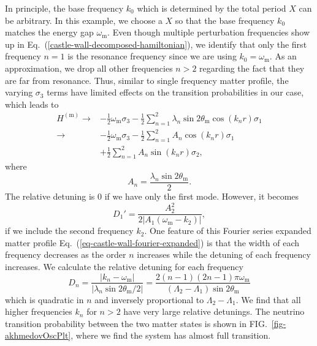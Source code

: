 \documentclass[%
reprint,
 amsmath,amssymb,
 prd,
]{revtex4-1}
\newcommand{\RD}{D}
\begin{document}
In principle, the base frequency $k_0$ which is determined by the total period $X$ can be arbitrary. In this example, we choose a $X$ so that the base frequency $k_0$ matches the energy gap $\omega_{\mathrm{m}}$. Even though multiple perturbation frequencies show up in Eq.~(\ref{castle-wall-decomposed-hamiltonian}), we identify that only the first frequency $n=1$ is the resonance frequency since we are using $k_0=\omega_{\mathrm{m}}$. As an approximation, we drop all other frequencies $n>2$ regarding the fact that they are far from resonance. Thus, similar to single frequency matter profile, the varying $\sigma_3$ terms have limited effects on the transition probabilities in our case, which leads to
\begin{align*}
    H^{(\mathrm m)} \to & - \frac{1}{2}\omega_{\mathrm m} \sigma_3  - \frac{1}{2} \sum_{n=1}^2\lambda_n \sin 2\theta_{\mathrm m}  \cos\left( k_n r \right) \sigma_1\\
    \to & - \frac{1}{2}\omega_{\mathrm m} \sigma_3  - \frac{1}{2} \sum_{n=1}^2 A_n \cos ( k_n r) \sigma_1 \\
    & + \frac{1}{2} \sum_{n=1}^2A_n \sin(k_n r) \sigma_2,
\end{align*}
where
\begin{equation*}
A_n = \frac{\lambda_n \sin 2\theta_{\mathrm m} }{2} .
\end{equation*}
The relative detuning is $0$ if we have only the first mode. However, it becomes
\begin{equation}
\RD_1'= \frac{A_2^2}{2\lvert A_1 (\omega_{\mathrm m} - k_2) \rvert},
\end{equation}
if we include the second frequency $k_2$. One feature of this Fourier series expanded matter profile Eq.~(\ref{eq-castle-wall-fourier-expanded}) is that the width of each frequency decreases as the order $n$ increases while the detuning of each frequency increases. We calculate the relative detuning for each frequency
\begin{equation}
\RD_n = \frac{\lvert k_n -\omega_{\mathrm m} \rvert}{ \lvert \lambda_n  \sin 2\theta_{\mathrm m}/2 \rvert } = \frac{2(n-1)(2n-1)\pi \omega_{\mathrm m}}{(\Lambda_2 - \Lambda_1)\sin 2\theta_{\mathrm m}}
\end{equation}
which is quadratic in $n$ and inversely proportional to $\Lambda_2-\Lambda_1$. We find that all higher frequencies $k_n$ for $n>2$ have very large relative detunings. The neutrino transition probability between the two matter states is shown in FIG.~\ref{fig-akhmedovOscPlt}, where we find the system has almost full transition.
\end{document}
